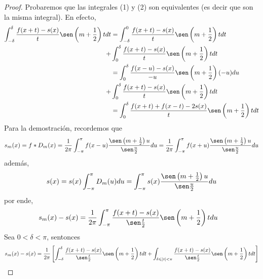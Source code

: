 \documentclass[12pt]{report}
\theoremstyle{largebreak}
\renewcommand{\leq}{\ensuremath{\leqslant}}
\begin{document}
    \begin{proof}
        Probaremos que las integrales (1) y (2) son equivalentes (es decir que son la misma integral). En efecto,
        \begin{equation*}
            \begin{split}
                \int_{-\delta}^\delta \frac{f(x+t)-s(x)}{t}\sen\left(m+\frac{1}{2} \right)tdt&=\int_{-\delta}^0\frac{f(x+t)-s(x)}{t}\sen\left(m+\frac{1}{2} \right)tdt\\
                +&\int_0^\delta \frac{f(x+t)-s(x)}{t}\sen\left(m+\frac{1}{2} \right)tdt\\
                &=\int_0^\delta \frac{f(x-u)-s(x)}{-u}\sen\left(m+\frac{1}{2} \right)(-u)du\\
                +&\int_0^\delta \frac{f(x+t)-s(x)}{t}\sen\left(m+\frac{1}{2} \right)tdt\\
                &=\int_0^\delta\frac{f(x+t)+f(x-t)-2s(x)}{t}\sen\left( m+\frac{1}{2}\right)tdt\\
            \end{split}
        \end{equation*}
        Para la demostración, recordemos que
        \begin{equation*}
            s_m(x)=f*D_m(x)=\frac{1}{2\pi}\int_{-\pi}^{\pi}f(x-u)\frac{\sen\left(m+\frac{1}{2} \right)u}{\sen\frac{u}{2}}du=\frac{1}{2\pi}\int_{-\pi}^{\pi}f(x+u)\frac{\sen\left(m+\frac{1}{2} \right)u}{\sen\frac{u}{2}}du
        \end{equation*}
        además,
        \begin{equation*}
            s(x)=s(x)\int_{-\pi}^\pi D_m(u)du=\int_{-\pi}^{\pi}s(x)\frac{\sen\left(m+\frac{1}{2} \right)u}{\sen\frac{u}{2}}du
        \end{equation*}
        por ende,
        \begin{equation*}
            \begin{split}
                s_m(x)-s(x)&=\frac{1}{2\pi}\int_{-\pi}^{\pi}\frac{f(x+t)-s(x)}{\sen\frac{t}{2}}\sen\left(m+\frac{1}{2} \right)tdu
            \end{split}
        \end{equation*}
        Sea $0<\delta<\pi$, sentonces
        \begin{equation*}
            \begin{split}
                s_m(x)-s(x)&=\frac{1}{2\pi}\left[\int_{-\delta}^{\delta}\frac{f(x+t)-s(x)}{\sen\frac{t}{2}}\sen\left(m+\frac{1}{2} \right)tdt+\int_{\delta\leq|t|<\pi}\frac{f(x+t)-s(x)}{\sen\frac{t}{2}}\sen\left(m+\frac{1}{2} \right)tdt\right] \\

\end{split}
\end{equation*}
\end{proof}
\end{document}
